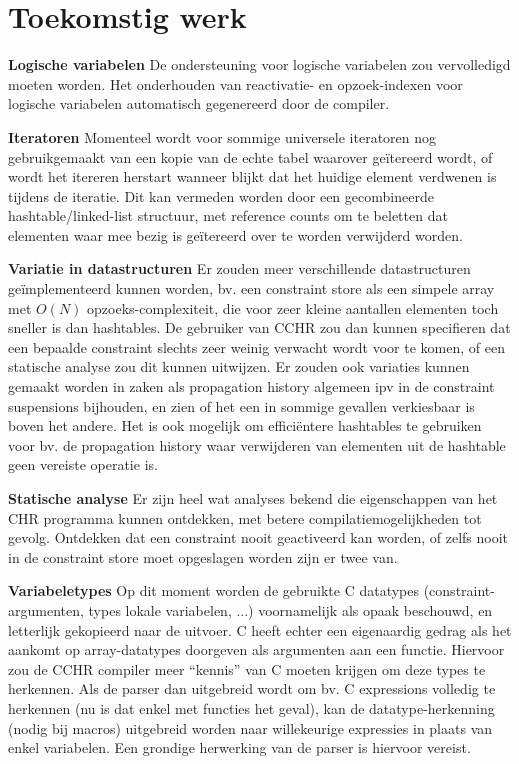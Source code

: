 \section{Toekomstig werk}

{\bf Logische variabelen} De ondersteuning voor logische variabelen zou vervolledigd moeten worden. Het onderhouden van reactivatie- en opzoek-indexen voor logische variabelen automatisch gegenereerd door de compiler.

{\bf Iteratoren} Momenteel wordt voor sommige universele iteratoren nog gebruikgemaakt van een kopie van de echte tabel waarover ge\"itereerd wordt, of wordt het itereren herstart wanneer blijkt dat het huidige element verdwenen is tijdens de iteratie. Dit kan vermeden worden door een gecombineerde hashtable/linked-list structuur, met reference counts om te beletten dat elementen waar mee bezig is ge\"itereerd over te worden verwijderd worden. 

{\bf Variatie in datastructuren} Er zouden meer verschillende datastructuren ge\"implementeerd kunnen worden, bv. een constraint store als een simpele array met $O(N)$ opzoeks-complexiteit, die voor zeer kleine aantallen elementen toch sneller is dan hashtables. De gebruiker van CCHR zou dan kunnen specifieren dat een bepaalde constraint slechts zeer weinig verwacht wordt voor te komen, of een statische analyse zou dit kunnen uitwijzen. Er zouden ook variaties kunnen gemaakt worden in zaken als propagation history algemeen ipv in de constraint suspensions bijhouden, en zien of het een in sommige gevallen verkiesbaar is boven het andere. Het is ook mogelijk om effici\"entere hashtables te gebruiken voor bv. de propagation history waar verwijderen van elementen uit de hashtable geen vereiste operatie is.

{\bf Statische analyse} Er zijn heel wat analyses bekend die eigenschappen van het CHR programma kunnen ontdekken, met betere compilatiemogelijkheden tot gevolg. Ontdekken dat een constraint nooit geactiveerd kan worden, of zelfs nooit in de constraint store moet opgeslagen worden zijn er twee van.

{\bf Variabeletypes} Op dit moment worden de gebruikte C datatypes (constraint-argumenten, types lokale variabelen, ...) voornamelijk als opaak beschouwd, en letterlijk gekopieerd naar de uitvoer. C heeft echter een eigenaardig gedrag als het aankomt op array-datatypes doorgeven als argumenten aan een functie. Hiervoor zou de CCHR compiler meer ``kennis'' van C moeten krijgen om deze types te herkennen. Als de parser dan uitgebreid wordt om bv. C expressions volledig te herkennen (nu is dat enkel met functies het geval), kan de datatype-herkenning (nodig bij macros) uitgebreid worden naar willekeurige expressies in plaats van enkel variabelen. Een grondige herwerking van de parser is hiervoor vereist.

